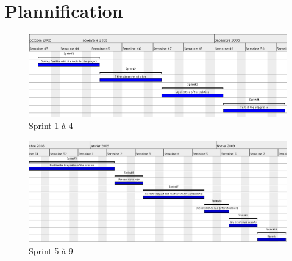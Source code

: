 \section*{Plannification}
\begin{figure}[H]
	\centering
	\includegraphics[width=1\textwidth]{../image/sprint1a4.png}
	\caption{Sprint 1 à 4}
\end{figure}
\begin{figure}[H]
	\centering
	\includegraphics[width=1\textwidth]{../image/sprint5a9.png}
	\caption{Sprint 5 à 9}
\end{figure}
% 
